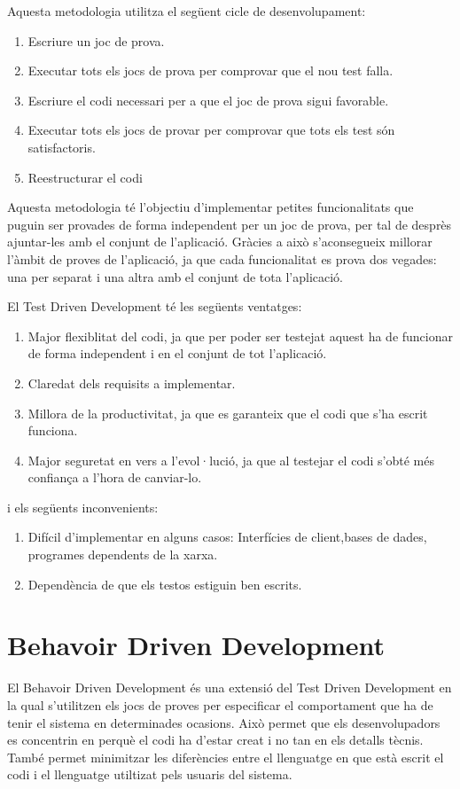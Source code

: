 \newpage

Aquesta metodologia utilitza el següent cicle de desenvolupament: 

\begin{enumerate}
    \item{Escriure un joc de prova.}
    \item{Executar tots els jocs de prova per comprovar que el nou test falla.}
    \item{Escriure el codi necessari per a que el joc de prova sigui favorable.}
    \item{Executar tots els jocs de provar per comprovar que tots els test són satisfactoris.}
    \item{Reestructurar el codi}
\end{enumerate}

Aquesta metodologia té l'objectiu d'implementar petites funcionalitats que puguin ser provades de forma independent per un joc de prova, per tal de desprès ajuntar-les amb el conjunt de l'aplicació. Gràcies a això s'aconsegueix millorar l'àmbit de proves de l'aplicació, ja que cada funcionalitat es prova dos vegades: una per separat i una altra amb el conjunt de tota l'aplicació.  

El Test Driven Development té les següents ventatges: 

\begin{enumerate}
    \item{Major flexiblitat del codi, ja que per poder ser testejat aquest ha de funcionar de forma independent i en el conjunt de tot l'aplicació.}
    \item{Claredat dels requisits a implementar.}
    \item{Millora de la productivitat, ja que es garanteix que el codi que s'ha escrit funciona.}
    \item{Major seguretat en vers a l'evol·lució, ja que al testejar el codi s'obté més confiança a l'hora de canviar-lo.}
\end{enumerate}

i els següents inconvenients: 

\begin{enumerate}
    \item{Difícil d'implementar en alguns casos: Interfícies de client,bases de dades, programes dependents de la xarxa.}
    \item{Dependència de que els testos estiguin ben escrits. }
\end{enumerate}

\section{Behavoir Driven Development}
\label{sec:bdd}

El Behavoir Driven Development és una extensió del Test Driven Development en la qual s'utilitzen els jocs de proves per 
especificar el comportament que ha de tenir el sistema en determinades ocasions. Això permet que els desenvolupadors es concentrin en perquè el codi ha d'estar creat i no tan en els detalls tècnis. També permet minimitzar les diferències entre el llenguatge en que està escrit el codi i el llenguatge utiltizat pels usuaris del sistema. 

